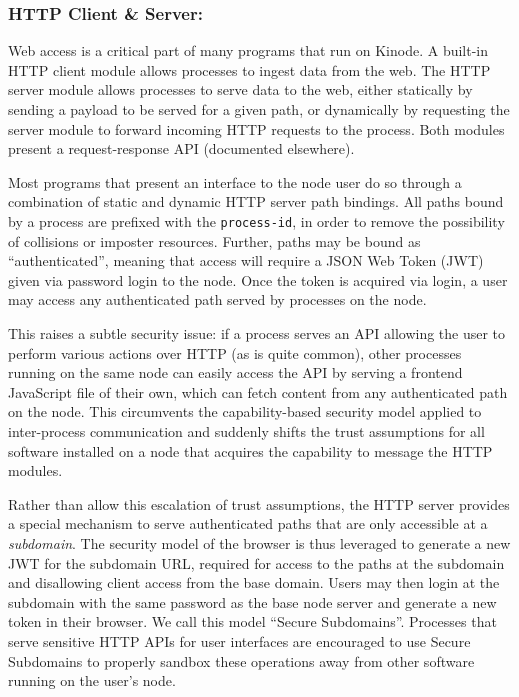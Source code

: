 \documentclass[runningheads]{llncs}
\begin{document}
\subsubsection{HTTP Client \& Server:}
\label{sec:oshttp}

Web access is a critical part of many programs that run on Kinode.
A built-in HTTP client module allows processes to ingest data from the web.
The HTTP server module allows processes to serve data to the web, either statically by sending a payload to be served for a given path, or dynamically by requesting the server module to forward incoming HTTP requests to the process.
Both modules present a request-response API (documented elsewhere).

Most programs that present an interface to the node user do so through a combination of static and dynamic HTTP server path bindings.
All paths bound by a process are prefixed with the \verb|process-id|, in order to remove the possibility of collisions or imposter resources.
Further, paths may be bound as ``authenticated'', meaning that access will require a JSON Web Token (JWT) given via password login to the node.
Once the token is acquired via login, a user may access any authenticated path served by processes on the node.

This raises a subtle security issue: if a process serves an API allowing the user to perform various actions over HTTP (as is quite common), other processes running on the same node can easily access the API by serving a frontend JavaScript file of their own, which can fetch content from any authenticated path on the node.
This circumvents the capability-based security model applied to inter-process communication and suddenly shifts the trust assumptions for all software installed on a node that acquires the capability to message the HTTP modules.

Rather than allow this escalation of trust assumptions, the HTTP server provides a special mechanism to serve authenticated paths that are only accessible at a \textit{subdomain}.
The security model of the browser is thus leveraged to generate a new JWT for the subdomain URL, required for access to the paths at the subdomain and disallowing client access from the base domain.
Users may then login at the subdomain with the same password as the base node server and generate a new token in their browser.
We call this model ``Secure Subdomains''.
Processes that serve sensitive HTTP APIs for user interfaces are encouraged to use Secure Subdomains to properly sandbox these operations away from other software running on the user's node.
\end{document}
